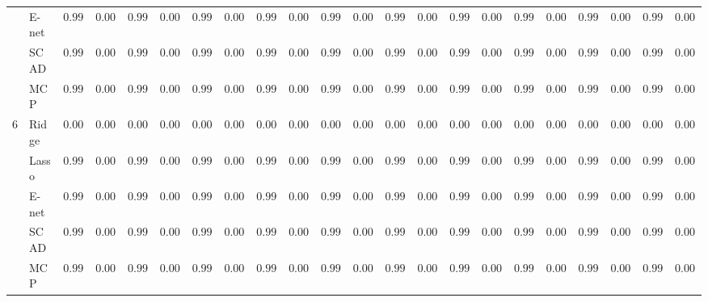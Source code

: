 \begin{tabular}{ll|ll|llllll|llllll|llllll}
 & E-net  & $0.9995$ & $0.0002$ & $0.9990$ & $0.0013$ & $0.9969$ & $0.0027$ & $0.9929$ & $0.0027$ & $0.9995$ & $0.0002$ & $0.9994$ & $0.0002$ & $0.9989$ & $0.0004$ & $0.9994$ & $0.0008$ & $0.9986$ & $0.0011$ & $0.9961$ & $0.0015$ \\
 & SCAD  & $0.9948$ & $0.0059$ & $0.9943$ & $0.0042$ & $0.9950$ & $0.0032$ & $0.9961$ & $0.0031$ & $0.9936$ & $0.0066$ & $0.9948$ & $0.0062$ & $0.9972$ & $0.0039$ & $0.9943$ & $0.0059$ & $0.9958$ & $0.0041$ & $0.9979$ & $0.0019$ \\
 & MCP  & $0.9984$ & $0.0018$ & $0.9980$ & $0.0017$ & $0.9984$ & $0.0009$ & $0.9991$ & $0.0004$ & $0.9982$ & $0.0018$ & $0.9982$ & $0.0022$ & $0.9988$ & $0.0012$ & $0.9982$ & $0.0018$ & $0.9987$ & $0.0013$ & $0.9988$ & $0.0011$ \\\hline
6 & Ridge  & $0.0000$ & $0.0000$ & $0.0000$ & $0.0000$ & $0.0000$ & $0.0000$ & $0.0000$ & $0.0000$ & $0.0000$ & $0.0000$ & $0.0000$ & $0.0000$ & $0.0000$ & $0.0000$ & $0.0000$ & $0.0000$ & $0.0000$ & $0.0000$ & $0.0000$ & $0.0000$ \\
 & Lasso  & $0.9995$ & $0.0002$ & $0.9994$ & $0.0008$ & $0.9992$ & $0.0009$ & $0.9987$ & $0.0011$ & $0.9995$ & $0.0000$ & $0.9995$ & $0.0001$ & $0.9994$ & $0.0002$ & $0.9995$ & $0.0001$ & $0.9995$ & $0.0002$ & $0.9992$ & $0.0005$ \\
 & E-net  & $0.9995$ & $0.0002$ & $0.9994$ & $0.0009$ & $0.9991$ & $0.0010$ & $0.9981$ & $0.0018$ & $0.9995$ & $0.0000$ & $0.9995$ & $0.0001$ & $0.9994$ & $0.0002$ & $0.9995$ & $0.0001$ & $0.9994$ & $0.0003$ & $0.9991$ & $0.0009$ \\
 & SCAD  & $0.9952$ & $0.0061$ & $0.9946$ & $0.0051$ & $0.9944$ & $0.0034$ & $0.9977$ & $0.0016$ & $0.9949$ & $0.0069$ & $0.9939$ & $0.0073$ & $0.9969$ & $0.0032$ & $0.9945$ & $0.0061$ & $0.9945$ & $0.0044$ & $0.9969$ & $0.0021$ \\
 & MCP  & $0.9982$ & $0.0020$ & $0.9979$ & $0.0018$ & $0.9983$ & $0.0009$ & $0.9990$ & $0.0003$ & $0.9980$ & $0.0018$ & $0.9979$ & $0.0023$ & $0.9986$ & $0.0016$ & $0.9981$ & $0.0020$ & $0.9983$ & $0.0014$ & $0.9986$ & $0.0011$ \\
\hline 
\end{tabular}

